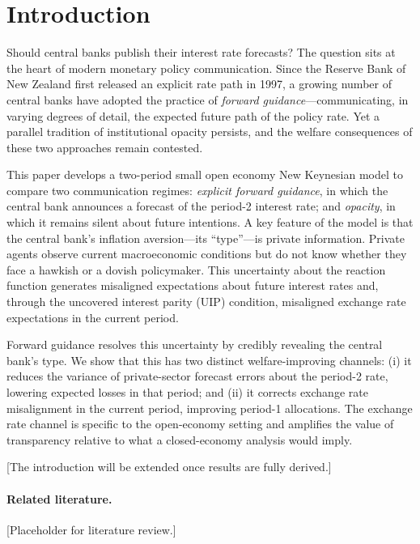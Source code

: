 
\section{Introduction}
\label{sec:intro}

Should central banks publish their interest rate forecasts? The question sits at the
heart of modern monetary policy communication. Since the Reserve Bank of New Zealand
first released an explicit rate path in 1997, a growing number of central banks have
adopted the practice of \emph{forward guidance}---communicating, in varying degrees of
detail, the expected future path of the policy rate. Yet a parallel tradition of
institutional opacity persists, and the welfare consequences of these two approaches
remain contested.

This paper develops a two-period small open economy New Keynesian model to compare
two communication regimes: \emph{explicit forward guidance}, in which the central bank
announces a forecast of the period-2 interest rate; and \emph{opacity}, in which it
remains silent about future intentions. A key feature of the model is that the central
bank's inflation aversion---its ``type''---is private information. Private agents
observe current macroeconomic conditions but do not know whether they face a hawkish
or a dovish policymaker. This uncertainty about the reaction function generates
misaligned expectations about future interest rates and, through the uncovered
interest parity (UIP) condition, misaligned exchange rate expectations in the current
period.

Forward guidance resolves this uncertainty by credibly revealing the central bank's
type. We show that this has two distinct welfare-improving channels: (i) it reduces the
variance of private-sector forecast errors about the period-2 rate, lowering expected
losses in that period; and (ii) it corrects exchange rate misalignment in the current
period, improving period-1 allocations. The exchange rate channel is specific to the
open-economy setting and amplifies the value of transparency relative to what a
closed-economy analysis would imply.

[The introduction will be extended once results are fully derived.]

\paragraph{Related literature.}
[Placeholder for literature review.]


